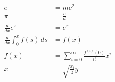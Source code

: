 \documentclass[a4paper,12pt]{article}
\begin{document}
\begin{align}
  e &= mc^2 \\
  \pi &= \frac{c}{d} \\
  \frac{d}{dx} e^x &= e^x \\
  \frac{d}{dx} \int_0^x f(s)\,ds &= f(x) \\
  f(x) &= \sum_{i=0}^{\infty} \frac{f^{(i)}(0)}{i!} x^i \\
  x &= \sqrt{\frac{x_i}{z} y}
\end{align}
\end{document}
